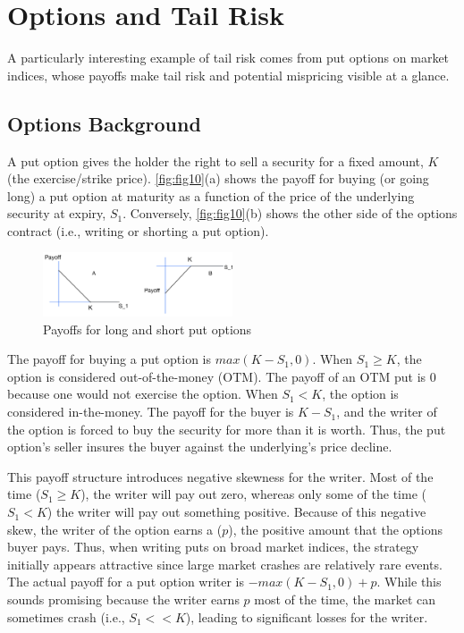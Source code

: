 \section{Options and Tail Risk}

A particularly interesting example of tail risk comes from put options on market indices, whose payoffs make tail risk and potential mispricing visible at a glance. 

\subsection{Options Background}
A put option gives the holder the right to sell a security for a fixed amount, $K$ (the exercise/strike price). \autoref{fig:fig10}(a) shows the payoff for buying (or going long) a put option at maturity as a function of the price of the underlying security at expiry, $S_1$. Conversely, \autoref{fig:fig10}(b) shows the other side of the options contract (i.e., writing or shorting a put option). 

\begin{figure}[h]
    \centering
    \includegraphics[width=0.50\textwidth]{fig10.png}
    \caption{Payoffs for long and short put options}
    \label{fig:fig10}
\end{figure}

The payoff for buying a put option is $max(K - S_1, 0)$. When $S_1 \ge K$, the option is considered out-of-the-money (OTM). The payoff of an OTM put is $0$ because one would not exercise the option. When $S_1 < K$, the option is considered in-the-money. The payoff for the buyer is $K-S_1$, and the writer of the option is forced to buy the security for more than it is worth. Thus, the put option’s seller insures the buyer against the underlying’s price decline. 

This payoff structure introduces negative skewness for the writer. Most of the time ($S_1 \ge K$), the writer will pay out zero, whereas only some of the time ($S_1 < K$) the writer will pay out something positive. Because of this negative skew, the writer of the option earns a  ($p$), the positive amount that the options buyer pays. Thus, when writing puts on broad market indices, the strategy initially appears attractive since large market crashes are relatively rare events. The actual payoff for a put option writer is $- max(K-S_1, 0) + p$. While this sounds promising because the writer earns $p$ most of the time, the market can sometimes crash (i.e., $S_1 << K$), leading to significant losses for the writer.

